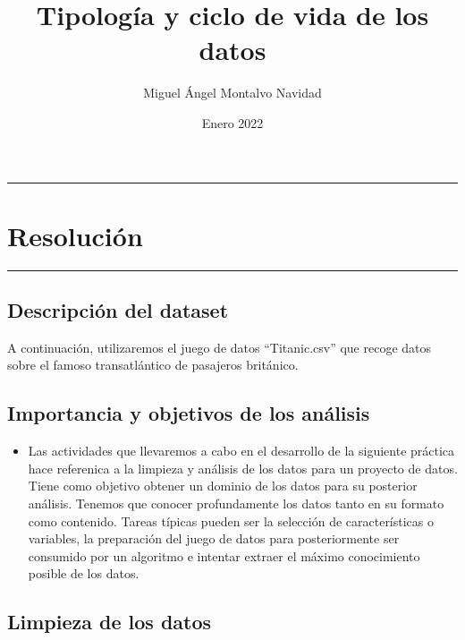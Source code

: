 \documentclass[
]{article}
\title{Tipología y ciclo de vida de los datos}
\author{Miguel Ángel Montalvo Navidad}
\date{Enero 2022}
\providecommand{\tightlist}{%
  \setlength{\itemsep}{0pt}\setlength{\parskip}{0pt}}
\begin{document}
\maketitle

{
\setcounter{tocdepth}{2}
\tableofcontents
}
\begin{center}\rule{0.5\linewidth}{0.5pt}\end{center}

\hypertarget{resoluciuxf3n}{%
\section{Resolución}\label{resoluciuxf3n}}

\begin{center}\rule{0.5\linewidth}{0.5pt}\end{center}

\hypertarget{descripciuxf3n-del-dataset}{%
\subsection{Descripción del dataset}\label{descripciuxf3n-del-dataset}}

A continuación, utilizaremos el juego de datos ``Titanic.csv'' que
recoge datos sobre el famoso transatlántico de pasajeros británico.

\hypertarget{importancia-y-objetivos-de-los-anuxe1lisis}{%
\subsection{Importancia y objetivos de los
análisis}\label{importancia-y-objetivos-de-los-anuxe1lisis}}

\begin{itemize}
\tightlist
\item
  Las actividades que llevaremos a cabo en el desarrollo de la siguiente
  práctica hace referenica a la limpieza y análisis de los datos para un
  proyecto de datos. Tiene como objetivo obtener un dominio de los datos
  para su posterior análisis. Tenemos que conocer profundamente los
  datos tanto en su formato como contenido. Tareas típicas pueden ser la
  selección de características o variables, la preparación del juego de
  datos para posteriormente ser consumido por un algoritmo e intentar
  extraer el máximo conocimiento posible de los datos.
\end{itemize}

\hypertarget{limpieza-de-los-datos}{%
\subsection{Limpieza de los datos}\label{limpieza-de-los-datos}}
\end{document}
